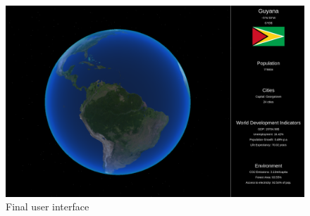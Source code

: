 \begin{figure}[h]
\centering
\includegraphics[width=0.7\linewidth]{images/final}
\caption{Final user interface}
\label{fig:final}
\end{figure}
